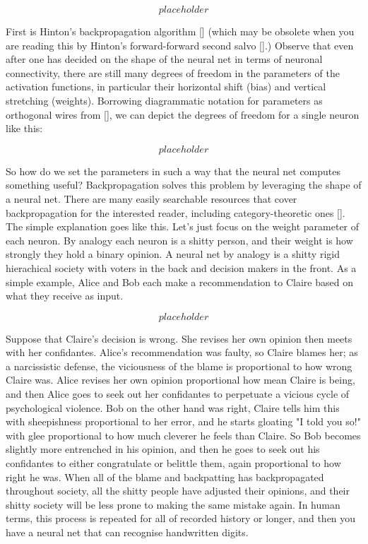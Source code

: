 \[placeholder\]

 First is Hinton's backpropagation algorithm [] (which may be obsolete when you are reading this by Hinton's forward-forward second salvo [].) Observe that even after one has decided on the shape of the neural net in terms of neuronal connectivity, there are still many degrees of freedom in the parameters of the activation functions, in particular their horizontal shift (bias) and vertical stretching (weights). Borrowing diagrammatic notation for parameters as orthogonal wires from [], we can depict the degrees of freedom for a single neuron like this:

\[placeholder\]

 So how do we set the parameters in such a way that the neural net computes something useful? Backpropagation solves this problem by leveraging the shape of a neural net. There are many easily searchable resources that cover backpropagation for the interested reader, including category-theoretic ones []. The simple explanation goes like this. Let's just focus on the weight parameter of each neuron. By analogy each neuron is a shitty person, and their weight is how strongly they hold a binary opinion. A neural net by analogy is a shitty rigid hierachical society with voters in the back and decision makers in the front. As a simple example, Alice and Bob each make a recommendation to Claire based on what they receive as input.

\[placeholder\]

Suppose that Claire's decision is wrong. She revises her own opinion then meets with her confidantes. Alice's recommendation was faulty, so Claire blames her; as a narcissistic defense, the viciousness of the blame is proportional to how wrong Claire was. Alice revises her own opinion proportional how mean Claire is being, and then Alice goes to seek out her confidantes to perpetuate a vicious cycle of psychological violence. Bob on the other hand was right, Claire tells him this with sheepishness proportional to her error, and he starts gloating "I told you so!" with glee proportional to how much cleverer he feels than Claire. So Bob becomes slightly more entrenched in his opinion, and then he goes to seek out his confidantes to either congratulate or belittle them, again proportional to how right he was. When all of the blame and backpatting has backpropagated throughout society, all the shitty people have adjusted their opinions, and their shitty society will be less prone to making the same mistake again. In human terms, this process is repeated for all of recorded history or longer, and then you have a neural net that can recognise handwritten digits.

